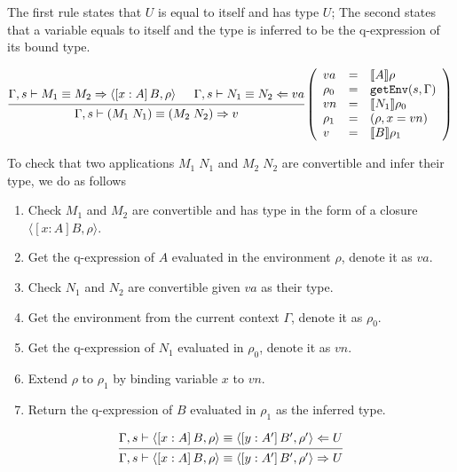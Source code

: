 \documentclass{article}
\theoremstyle{remark}
\begin{document}
The first rule states that $U$ is equal to itself and has type $U$; The second states that a variable equals to itself and the type is inferred to be the q-expression of its bound type.

\begin{align}
  \begin{prooftree}
    \hypo{\Gamma,s \vdash M_1 \equiv M_2 \Rightarrow \langle [x : A] \, B, \rho \rangle}
    \hypo{\Gamma,s \vdash N_1 \equiv N_2 \Leftarrow va}
    \infer2{\Gamma,s \vdash (M_1 \; N_1) \equiv (M_2 \; N_2) \Rightarrow v} 
  \end{prooftree}\left(\begin{array}{l l l}
                         va &= &\llbracket A \rrbracket \rho \\
                         \rho_0 &= &\texttt{getEnv}(s, \Gamma) \\
                         vn &= &\llbracket N_1 \rrbracket \rho_0 \\ 
                         \rho_1 &= &(\rho, x = vn) \\
                         v &= &\llbracket B \rrbracket \rho_1 \\
                       \end{array}\right)
\end{align}

To check that two applications $M_1 \; N_1$ and $M_2 \; N_2$ are convertible and infer their type, we do as follows
\begin{enumerate}
  \item Check $M_1$ and $M_2$ are convertible and has type in the form of a closure $\langle [x : A] B, \rho \rangle$.
  \item Get the q-expression of $A$ evaluated in the environment $\rho$, denote it as $va$.
  \item Check $N_1$ and $N_2$ are convertible given $va$ as their type.
  \item Get the environment from the current context $\Gamma$, denote it as $\rho_0$.
  \item Get the q-expression of $N_1$ evaluated in $\rho_0$, denote it as $vn$.
  \item Extend $\rho$ to $\rho_1$ by binding variable $x$ to $vn$. 
  \item Return the q-expression of $B$ evaluated in $\rho_1$ as the inferred type.
\end{enumerate}

\begin{align}
  \begin{prooftree}
    \hypo{\Gamma,s \vdash \langle [x : A] \, B, \rho \rangle \equiv \langle [y : A'] \, B', \rho' \rangle \Leftarrow U}
    \infer1{\Gamma,s \vdash \langle [x : A] \, B, \rho \rangle \equiv \langle [y : A'] \, B', \rho' \rangle \Rightarrow U} 
  \end{prooftree}
\end{align}
\end{document}
